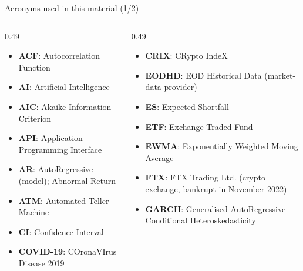 
{
\begin{frame}[noframenumbering]
    \titlepage
\end{frame}
}
\begin{frame}{Acronyms used in this material (1/2)}
\begin{columns}[T]
\begin{column}{0.49\textwidth}
\begin{itemize}\setlength{\itemsep}{0pt}
    \item \textbf{ACF}: Autocorrelation Function
    \item \textbf{AI}: Artificial Intelligence
    \item \textbf{AIC}: Akaike Information Criterion
    \item \textbf{API}: Application Programming Interface
    \item \textbf{AR}: AutoRegressive (model); Abnormal Return
    \item \textbf{ATM}: Automated Teller Machine
    \item \textbf{CI}: Confidence Interval
    \item \textbf{COVID-19}: COronaVIrus Disease 2019
\end{itemize}
\end{column}
\begin{column}{0.49\textwidth}
\begin{itemize}\setlength{\itemsep}{0pt}
    \item \textbf{CRIX}: CRypto IndeX
    \item \textbf{EODHD}: EOD Historical Data (market-data provider)
    \item \textbf{ES}: Expected Shortfall
    \item \textbf{ETF}: Exchange-Traded Fund
    \item \textbf{EWMA}: Exponentially Weighted Moving Average
    \item \textbf{FTX}: FTX Trading Ltd. (crypto exchange, bankrupt in November 2022)
    \item \textbf{GARCH}: Generalised AutoRegressive Conditional Heteroskedasticity
\end{itemize}
\end{column}
\end{columns}
\end{frame}
